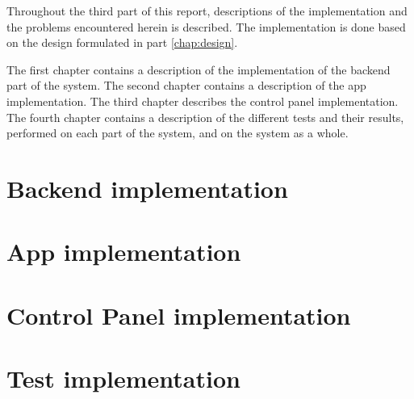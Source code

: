 Throughout the third part of this report, descriptions of the implementation and the problems encountered herein is described. The implementation is done based on the design formulated in part \ref{chap:design}. 

The first chapter contains a description of the implementation of the backend part of the system. The second chapter contains a description of the app implementation. The third chapter describes the control panel implementation. The fourth chapter contains a description of the different tests and their results, performed on each part of the system, and on the system as a whole.

\chapter{Backend implementation}

\chapter{App implementation} \label{chap:app}

\chapter{Control Panel implementation} \label{chap:controlPanel}

\chapter{Test implementation}

